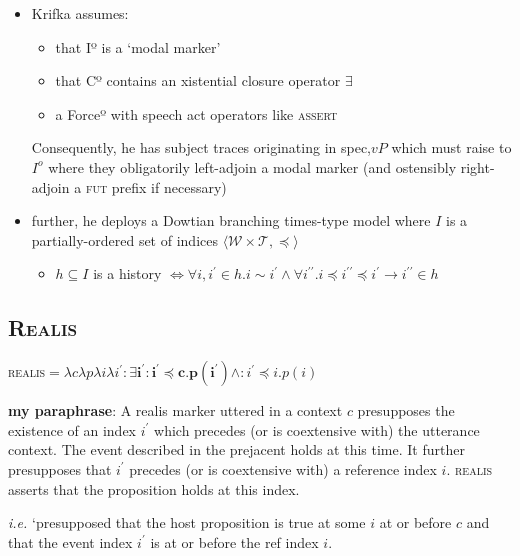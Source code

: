 \documentclass[10pt]{article}
\begin{document}
\begin{itemize}
\item Krifka assumes: \begin{itemize}

\item  that Iº is a `modal marker'
\item that Cº contains an xistential closure operator $\exists$
\item a Forceº with speech act operators like \textsc{assert} \end{itemize}

Consequently, he has subject traces originating in spec,$vP$ which must raise to $I^o$ where they obligatorily left-adjoin a modal marker (and ostensibly right-adjoin a \textsc{fut} prefix if necessary)
\item further, he deploys a Dowtian branching times-type model where $I$ is a partially-ordered set of indices $\langle \mathcal{W\times T,\preceq}\rangle$
\begin{itemize}
	\item $h\subseteq I$ is a history $\iff\forall i,i^\prime\in h.i\sim i^\prime\wedge\forall i^{\prime\prime}.i\preceq i^{\prime\prime}\preceq i^\prime\to i^{\prime\prime}\in h$
\end{itemize}
\end{itemize}
\subsection{\textsc{Realis}}
\textsc{realis}$=\lambda c\lambda p \lambda i\lambda i^\prime\boldsymbol{:\exists i^\prime:i^\prime\preceq c.p(i^\prime)}\wedge: i^\prime\preceq i.p(i) $

\textbf{my paraphrase}: A realis marker uttered in a context $c$ presupposes the existence of an index $i^\prime$ which precedes (or is coextensive with) the utterance context. The event described in the prejacent holds at this time. It further presupposes that $i^\prime$ precedes (or is coextensive with) a reference index $i$. \textsc{realis} asserts that the proposition holds at this index.

\textit{i.e.} `presupposed that the host proposition is true at some $i$ at or before $c$ and that the event index $i^\prime$ is at or before the ref index $i$.
\end{document}
